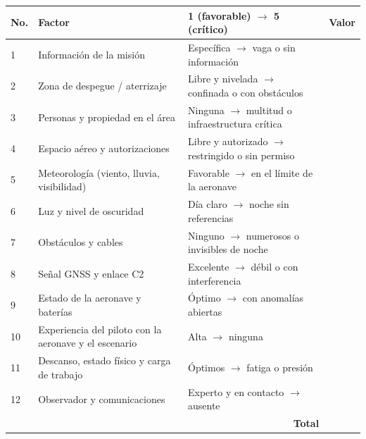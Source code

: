{\setlength{\tabcolsep}{3pt}\begin{tabularx}{\textwidth}{|p{0.9cm}|X|X|p{1.1cm}|}
\hline
\rowcolor[gray]{0.9}\textbf{No.} & \textbf{Factor} & \textbf{1 (favorable)  $\rightarrow$  5 (crítico)} & \textbf{Valor} \\ \hline
1 & Información de la misión & Específica $\rightarrow$ vaga o sin información & \\ \hline
2 & Zona de despegue / aterrizaje & Libre y nivelada $\rightarrow$ confinada o con obstáculos & \\ \hline
3 & Personas y propiedad en el área & Ninguna $\rightarrow$ multitud o infraestructura crítica & \\ \hline
4 & Espacio aéreo y autorizaciones & Libre y autorizado $\rightarrow$ restringido o sin permiso & \\ \hline
5 & Meteorología (viento, lluvia, visibilidad) & Favorable $\rightarrow$ en el límite de la aeronave & \\ \hline
6 & Luz y nivel de oscuridad & Día claro $\rightarrow$ noche sin referencias & \\ \hline
7 & Obstáculos y cables & Ninguno $\rightarrow$ numerosos o invisibles de noche & \\ \hline
8 & Señal GNSS y enlace C2 & Excelente $\rightarrow$ débil o con interferencia & \\ \hline
9 & Estado de la aeronave y baterías & Óptimo $\rightarrow$ con anomalías abiertas & \\ \hline
10 & Experiencia del piloto con la aeronave y el escenario & Alta $\rightarrow$ ninguna & \\ \hline
11 & Descanso, estado físico y carga de trabajo & Óptimos $\rightarrow$ fatiga o presión & \\ \hline
12 & Observador y comunicaciones & Experto y en contacto $\rightarrow$ ausente & \\ \hline
\multicolumn{3}{|r|}{\textbf{Total}} & \\ \hline
\end{tabularx}}

\vspace{0.3cm}

